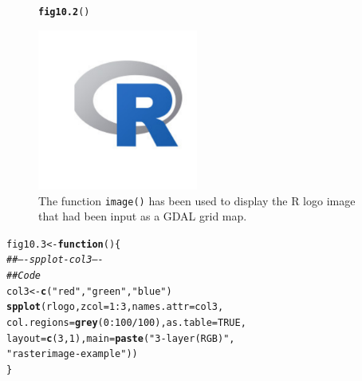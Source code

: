 \documentclass[12pt, a4paper,  BCOR=8.25mm, DIV=15]{scrartcl}\usepackage[]{graphicx}\usepackage[]{color}
\makeatletter
\newcommand{\hlnum}[1]{\textcolor[rgb]{0.686,0.059,0.569}{#1}}%
\newcommand{\hlstr}[1]{\textcolor[rgb]{0.192,0.494,0.8}{#1}}%
\newcommand{\hlcom}[1]{\textcolor[rgb]{0.678,0.584,0.686}{\textit{#1}}}%
\newcommand{\hlopt}[1]{\textcolor[rgb]{0,0,0}{#1}}%
\newcommand{\hlstd}[1]{\textcolor[rgb]{0.345,0.345,0.345}{#1}}%
\newcommand{\hlkwa}[1]{\textcolor[rgb]{0.161,0.373,0.58}{\textbf{#1}}}%
\newcommand{\hlkwb}[1]{\textcolor[rgb]{0.69,0.353,0.396}{#1}}%
\newcommand{\hlkwc}[1]{\textcolor[rgb]{0.333,0.667,0.333}{#1}}%
\newcommand{\hlkwd}[1]{\textcolor[rgb]{0.737,0.353,0.396}{\textbf{#1}}}%
\newenvironment{kframe}{%
 \def\at@end@of@kframe{}%
 \ifinner\ifhmode%
  \def\at@end@of@kframe{\end{minipage}}%
  \begin{minipage}{\columnwidth}%
 \fi\fi%
 \def\FrameCommand##1{\hskip\@totalleftmargin \hskip-\fboxsep
 \colorbox{shadecolor}{##1}\hskip-\fboxsep
     \hskip-\linewidth \hskip-\@totalleftmargin \hskip\columnwidth}%
 \MakeFramed {\advance\hsize-\width
   \@totalleftmargin\z@ \linewidth\hsize
   \@setminipage}}%
 {\par\unskip\endMakeFramed%
 \at@end@of@kframe}
\newenvironment{knitrout}{}{} %
\newcommand{\txtt}[1]{{\texttt{#1}}}
\makeatother
\begin{document}
\begin{figure}
\begin{knitrout}
\color{fgcolor}\begin{kframe}
\begin{alltt}
\hlkwd{fig10.2}\hlstd{()}
\end{alltt}
\end{kframe}

{\centering \includegraphics[width=0.47\textwidth]{figs/map-rlogo-image-10_2-1} 

}



\end{knitrout}
\caption{The function \txtt{image()} has been used to display the R
  logo image that had been input as a GDAL grid map.\label{fig:rlogo}}
\end{figure}

\begin{knitrout}
\color{fgcolor}\begin{kframe}
\begin{alltt}
\hlstd{fig10.3} \hlkwb{<-} \hlkwa{function}\hlstd{()\{}
\hlcom{## ---- spplot-col3 ----}
\hlcom{## Code}
\hlstd{col3} \hlkwb{<-} \hlkwd{c}\hlstd{(}\hlstr{"red"}\hlstd{,}\hlstr{"green"}\hlstd{,}\hlstr{"blue"}\hlstd{)}
\hlkwd{spplot}\hlstd{(rlogo,} \hlkwc{zcol}\hlstd{=}\hlnum{1}\hlopt{:}\hlnum{3}\hlstd{,} \hlkwc{names.attr}\hlstd{=col3,}
       \hlkwc{col.regions}\hlstd{=}\hlkwd{grey}\hlstd{(}\hlnum{0}\hlopt{:}\hlnum{100}\hlopt{/}\hlnum{100}\hlstd{),} \hlkwc{as.table}\hlstd{=}\hlnum{TRUE}\hlstd{,}
       \hlkwc{layout}\hlstd{=}\hlkwd{c}\hlstd{(}\hlnum{3}\hlstd{,}\hlnum{1}\hlstd{),} \hlkwc{main}\hlstd{=}\hlkwd{paste}\hlstd{(}\hlstr{"3-layer (RGB)"}\hlstd{,}
       \hlstr{"raster image - example"}\hlstd{))}
\hlstd{\}}
\end{alltt}
\end{kframe}
\end{knitrout}
\end{document}
